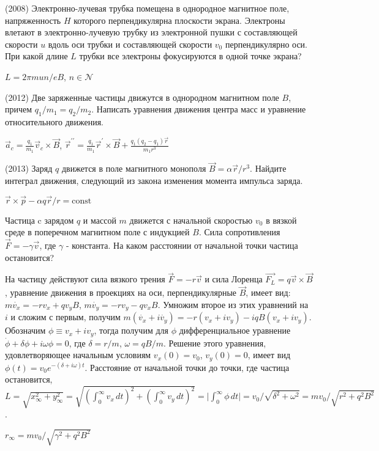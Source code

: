 \begin{ex}
(2008) Электронно-лучевая трубка помещена в однородное магнитное поле, напряженность $H$ которого перпендикулярна плоскости экрана. Электроны влетают в электронно-лучевую трубку из электронной пушки с составляющей скорости $u$ вдоль оси трубки и составляющей скорости $v_0$ перпендикулярно оси. При какой длине $L$ трубки все электроны фокусируются в одной точке экрана?
\begin{ans}
$L=2\pi m u n/ eB$, $n \in \mathcal{N}$
\end{ans}
\end{ex}

\begin{ex}
(2012) Две заряженные частицы движутся в однородном магнитном поле $B$, причем $q_1/m_1 = q_2/m_2$. Написать уравнения движения центра масс и уравнение относительного движения.
\begin{ans}
$\vec{a}_c = \frac{q_1}{m_1}\vec{v}_c \times \vec B$, 
${\vec{r}}^{\prime \prime} = \frac{q_1}{m_1}\vec{r}^{\prime} \times \vec B + \frac{q_1(q_2-q_1)\vec r}{m_1 r^3}$
\end{ans}
\end{ex}

\begin{ex}
(2013) Заряд $q$ движется в поле магнитного монополя $\vec{B} = \alpha \vec{r}/r^3$. Найдите интеграл движения, следующий из закона изменения момента импульса заряда.
\begin{ans}
$\vec r \times \vec p - \alpha q \vec r/ r = \text{const} $
\end{ans}
\end{ex}

\begin{ex}
Частица c зарядом $q$ и массой $m$ движется с начальной скоростью $v_0$ в вязкой среде в поперечном магнитном поле с индукцией $B$. Сила сопротивления $\vec{F} = -\gamma \vec{v}$, где $\gamma$ - константа. На каком расстоянии от начальной точки частица остановится?
\begin{sol}
На частицу действуют сила вязкого трения $\vec{F} = - r\vec{v}$ и сила Лоренца $\vec{F_L} = q \vec{v} \times \vec{B}$, уравнение движения в проекциях на оси, перпендикулярные $\vec{B}$, имеет вид:  $m \dot{v_x}=-rv_x+q v_y B$, $m \dot{v_y}=-rv_y-q v_x B$. Умножим второе из этих уравнений на $i$ и сложим с первым, получим $m\left( \dot{v_x} +i \dot{v_y} \right) = -r(v_x+i v_y) - iqB(v_x+i v_y)$. Обозначим $\phi \equiv v_x+i v_y$, тогда получим для $\phi$ дифференциальное уравнение $\dot{\phi} + \delta \phi + i\omega \phi=0$, где $\delta=r/m$,  $\omega=qB/m$. Решение этого уравнения, удовлетворяющее начальным условиям $v_x(0)=v_0$, $v_y(0)=0$, имеет вид $\phi(t)=v_0 e^{-(\delta +i\omega) t}$. Расстояние от начальной точки до точки, где частица остановится, $L=\sqrt{x_{\infty}^2 + y_{\infty}^2} =\sqrt{ \left( \int_{0}^{\infty}{v_x \, dt} \right)^2 + \left( \int_{0}^{\infty}{v_y \, dt} \right)^2}=\vert \int_{0}^{\infty}{ \phi \, dt} \vert=v_0/\sqrt{\delta^2 +\omega^2}=m v_0/\sqrt{r^2+q^2B^2}$.
\end{sol}
\begin{ans}
$r_{\infty} = mv_0/\sqrt{\gamma^2 + q^2B^2}$
\end{ans}
\end{ex}


